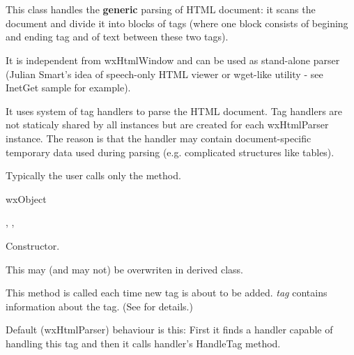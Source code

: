%
%

\section{}\label{wxhtmlparser}

This class handles the {\bf generic} parsing of HTML document: it scans
the document and divide it into blocks of tags (where one block
consists of begining and ending tag and of text between these
two tags).

It is independent from wxHtmlWindow and can be used as stand-alone parser
(Julian Smart's idea of speech-only HTML viewer or wget-like utility -
see InetGet sample for example).

It uses system of tag handlers to parse the HTML document. Tag handlers
are not staticaly shared by all instances but are created for each
wxHtmlParser instance. The reason is that the handler may contain
document-specific temporary data used during parsing (e.g. complicated
structures like tables).

Typically the user calls only the  method.


wxObject


,
,


\label{wxhtmlparserwxhtmlparser}


Constructor.

\label{wxhtmlparseraddtag}


This may (and may not) be overwriten in derived class.

This method is called each time new tag is about to be added. 
{\it tag} contains information about the tag. (See 
for details.)

Default (wxHtmlParser) behaviour is this:
First it finds a handler capable of handling this tag and then it calls
handler's HandleTag method.

